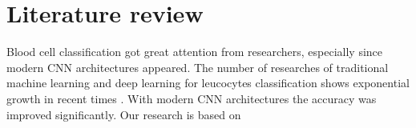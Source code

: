 \section{Literature review}
Blood cell classification got great attention from researchers, especially since modern CNN architectures appeared. The number of researches of traditional machine learning and deep learning for leucocytes classification shows exponential growth in recent times 
. With modern CNN architectures the accuracy was improved significantly.
Our research is based on 


\subsection{}

